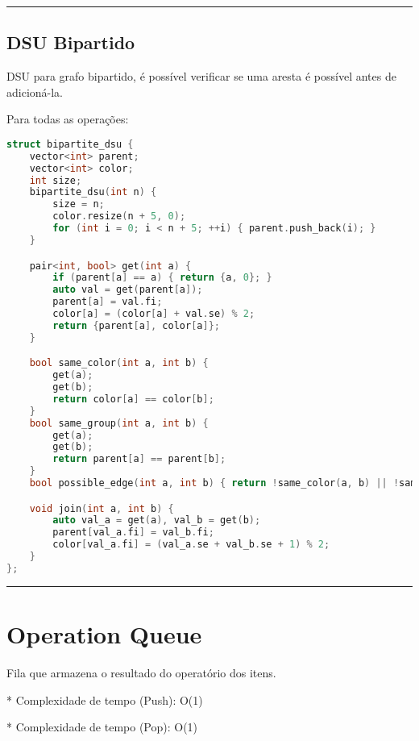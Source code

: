 \documentclass[11pt, a4paper, twoside]{book}
\begin{document}
\hfill

\rule{\textwidth}{0.4pt}

\subsection{DSU Bipartido}



DSU para grafo bipartido, é possível verificar se uma aresta é possível antes de adicioná-la.  

Para todas as operações:




\hfill

\begin{lstlisting}[language=C++]
struct bipartite_dsu {
    vector<int> parent;
    vector<int> color;
    int size;
    bipartite_dsu(int n) {
        size = n;
        color.resize(n + 5, 0);
        for (int i = 0; i < n + 5; ++i) { parent.push_back(i); }
    }

    pair<int, bool> get(int a) {
        if (parent[a] == a) { return {a, 0}; }
        auto val = get(parent[a]);
        parent[a] = val.fi;
        color[a] = (color[a] + val.se) % 2;
        return {parent[a], color[a]};
    }

    bool same_color(int a, int b) {
        get(a);
        get(b);
        return color[a] == color[b];
    }
    bool same_group(int a, int b) {
        get(a);
        get(b);
        return parent[a] == parent[b];
    }
    bool possible_edge(int a, int b) { return !same_color(a, b) || !same_group(a, b); }

    void join(int a, int b) {
        auto val_a = get(a), val_b = get(b);
        parent[val_a.fi] = val_b.fi;
        color[val_a.fi] = (val_a.se + val_b.se + 1) % 2;
    }
};
\end{lstlisting}

\hfill

\rule{\textwidth}{0.4pt}

\section{Operation Queue}



Fila que armazena o resultado do operatório dos itens.



* Complexidade de tempo (Push): O(1)

* Complexidade de tempo (Pop): O(1)
\end{document}
